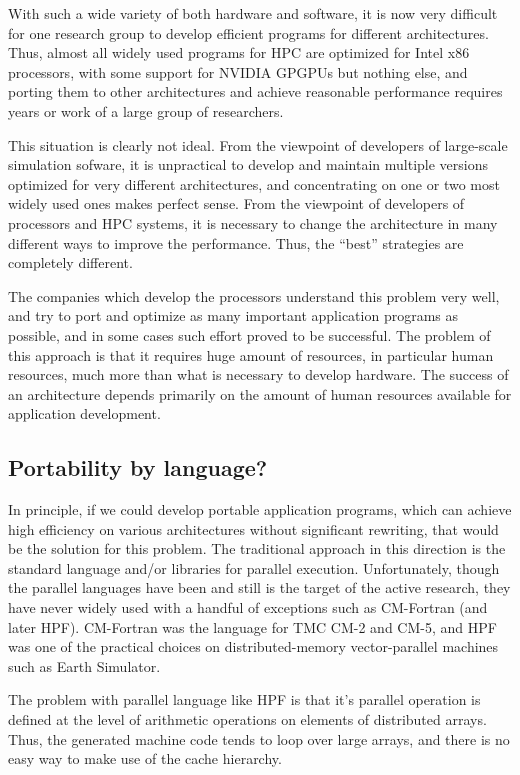 With such a wide variety of both hardware and software, it is now very
difficult for one research group to develop efficient programs for
different architectures. Thus, almost all widely used programs for HPC
are optimized for Intel x86 processors, with some support for NVIDIA
GPGPUs but nothing else, and porting  them to  other architectures and
achieve reasonable performance requires years or work of a large group
of researchers.

This situation is clearly not ideal. From the viewpoint of 
developers of large-scale simulation sofware, it is unpractical to
develop and maintain multiple versions optimized for very different
architectures, and concentrating on one or two most widely used ones
makes  perfect sense. From the viewpoint of developers of processors
and HPC systems, it is necessary to change the architecture in many
different ways to improve the performance.  Thus, the ``best''
strategies are completely different.

The companies which develop the processors understand this
problem very well, and try to port and optimize as many important
application programs as possible, and in some cases such effort proved
to be successful. The problem of this approach is that it requires huge
amount of resources, in particular human resources, much more than
what is necessary to develop hardware. The success of an architecture
depends primarily on the amount of human resources available for
application development.

\subsection{Portability by language?}
In principle, if we could develop portable application programs, which
can achieve high efficiency on various architectures without
significant rewriting, that would be the solution for this
problem. The traditional approach in this direction is the standard
language and/or libraries for parallel execution. Unfortunately,
though the parallel languages have been and still is the target of the active
research, they have  never widely used with a handful of exceptions such
as CM-Fortran (and later HPF). CM-Fortran was the language for TMC
CM-2 and CM-5, and HPF was one of the practical choices on
distributed-memory vector-parallel machines such as Earth Simulator.

The problem with parallel language like HPF is that it's parallel
operation is defined at the  level of arithmetic operations on 
elements of distributed arrays. Thus, the generated machine code tends
to loop over large arrays, and there is no easy way to make use of the
cache hierarchy.


